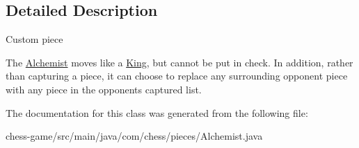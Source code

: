 \subsection{Detailed Description}
Custom piece

The \mbox{\hyperlink{classcom_1_1chess_1_1pieces_1_1_alchemist}{Alchemist}} moves like a \mbox{\hyperlink{classcom_1_1chess_1_1pieces_1_1_king}{King}}, but cannot be put in check. In addition, rather than capturing a piece, it can choose to replace any surrounding opponent piece with any piece in the opponent\textquotesingle{}s captured list. 

The documentation for this class was generated from the following file\+:\begin{DoxyCompactItemize}
\item 
chess-\/game/src/main/java/com/chess/pieces/Alchemist.\+java\end{DoxyCompactItemize}

